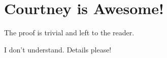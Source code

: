 \documentclass{amsart}
\begin{document}
\section{Courtney is Awesome!}

The proof is trivial and left to the reader.

I don't understand. Details please!
\end{document}
